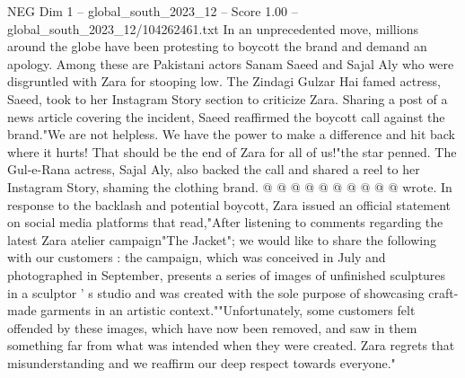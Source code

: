 \begin{textsample}{NEG Dim 1 – global\_south\_2023\_12 – Score 1.00 – global\_south\_2023\_12/104262461.txt}
In an unprecedented move, millions around the globe have been protesting to boycott the brand and demand an apology.
Among these are Pakistani actors Sanam Saeed and Sajal Aly who were disgruntled with Zara for stooping low.
The Zindagi Gulzar Hai famed actress, Saeed, took to her Instagram Story section to criticize Zara.
Sharing a post of a news article covering the incident, Saeed reaffirmed the boycott call against the brand."We are not helpless.
We have the power to make a difference and hit back where it hurts!
That should be the end of Zara for all of us!"the star penned.
The Gul-e-Rana actress, Sajal Aly, also backed the call and shared a reel to her Instagram Story, shaming the clothing brand. @ @ @ @ @ @ @ @ @ @ wrote.
In response to the backlash and potential boycott, Zara issued an official statement on social media platforms that read,"After listening to comments regarding the latest Zara atelier campaign"The Jacket"; we would like to share the following with our customers : the campaign, which was conceived in July and photographed in September, presents a series of images of unfinished sculptures in a sculptor ' s studio and was created with the sole purpose of showcasing craft-made garments in an artistic context.""Unfortunately, some customers felt offended by these images, which have now been removed, and saw in them something far from what was intended when they were created.
Zara regrets that misunderstanding and we reaffirm our deep respect towards everyone."

\end{textsample}

